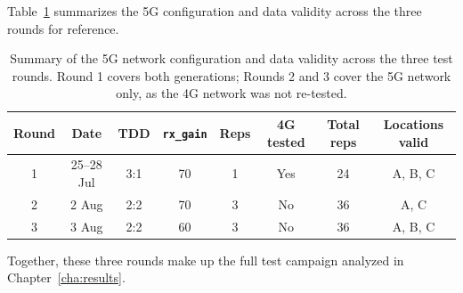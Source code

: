 Table~\ref{tab:test-rounds-summary} summarizes the 5G configuration and data validity across the three rounds for reference.

\begin{table}[htbp]
    \centering
    \begin{tabular}{|c|c|c|c|c|c|c|c|}
        \hline
        \textbf{Round} & \textbf{Date} & \textbf{TDD} & \textbf{\texttt{rx\_gain}} & \textbf{Reps} & \textbf{4G tested} & \textbf{Total reps} & \textbf{Locations valid} \\
        \hline
        1 & 25--28 Jul & 3:1 & 70 & 1 & Yes & 24 & A, B, C \\
        \hline
        2 & 2 Aug & 2:2 & 70 & 3 & No & 36 & A, C \\
        \hline
        3 & 3 Aug & 2:2 & 60 & 3 & No & 36 & A, B, C \\
        \hline
    \end{tabular}
    \caption[5G configuration and data validity across the three rounds.]{Summary of the 5G network configuration and data validity across the three test rounds. Round 1 covers both generations; Rounds 2 and 3 cover the 5G network only, as the 4G network was not re-tested.}
    \label{tab:test-rounds-summary}
\end{table}

Together, these three rounds make up the full test campaign analyzed in Chapter~\ref{cha:results}.
